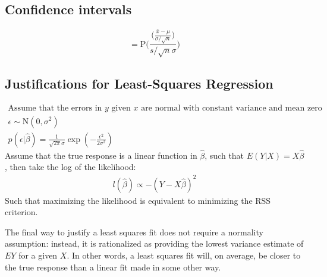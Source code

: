 \documentclass[11pt,a4paper,article]{memoir} %
\begin{document}
\subsection{Confidence intervals}
\[
	 = \text{P}\Bigg(\frac{\Big(\frac{\bar{x} - \mu}{\sigma/\sqrt{n}}\Big)}{s/\sqrt{n}\sigma}\Bigg)
\]


\subsection{Justifications for Least-Squares Regression}
\begin{gather}
	\text{Assume that the errors in $y$ given $x$ are normal with constant variance and mean zero}\\
	\epsilon \sim \text{N}(0, \sigma^2) \\
	p(\epsilon|\hat{\beta}) = \frac{1}{\sqrt{2\pi}\sigma} \exp (-\frac{\epsilon^2}{2\sigma^2})
\end{gather}
Assume that the true response is a linear function in $\hat{\beta}$, such that $E(Y|X) = X\hat{\beta}$, then take the log of the likelihood:
\begin{gather}
	l(\hat{\beta}) \propto -(Y - X\hat{\beta})^2
\end{gather}
Such that maximizing the likelihood is equivalent to minimizing the RSS criterion.

The final way to justify a least squares fit does not require a normality assumption: instead, it is rationalized as providing the lowest variance estimate of $EY$ for a given $X$. In other words, a least squares fit will, on average, be closer to the true response than a linear fit made in some other way.
\end{document}
